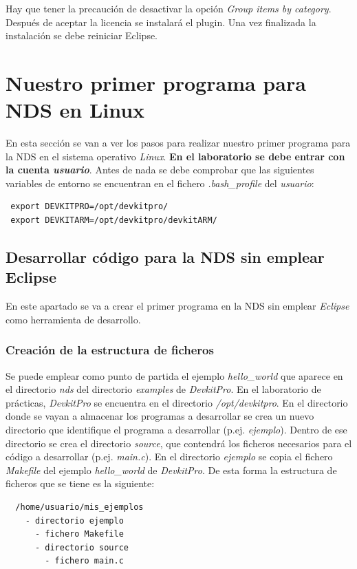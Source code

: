 Hay que tener la precaución de desactivar la opción \textit{Group items by category}. Después de aceptar la licencia se instalará el plugin. Una vez finalizada la instalación se debe reiniciar Eclipse.

\section{Nuestro primer programa para NDS en Linux}
En esta sección se van a ver los pasos para realizar nuestro primer programa para la NDS en el sistema operativo \textit{Linux}. \textbf{En el laboratorio se debe entrar con la cuenta \textit{usuario}}. Antes de nada se debe comprobar que las siguientes variables de entorno se encuentran en el fichero \textit{.bash\_profile} del \textit{usuario}:
\begin{verbatim}
 export DEVKITPRO=/opt/devkitpro/
 export DEVKITARM=/opt/devkitpro/devkitARM/
\end{verbatim}

\subsection{Desarrollar código para la NDS sin emplear Eclipse}
En este apartado se va a crear el primer programa en la NDS sin emplear \textit{Eclipse} como herramienta de desarrollo.

\subsubsection{Creación de la estructura de ficheros}
Se puede emplear como punto de partida el ejemplo  \textit{hello\_world} que aparece en el directorio \textit{nds} del directorio \textit{examples} de  \textit{DevkitPro}. En  el laboratorio de prácticas, \textit{DevkitPro} se encuentra en el directorio \textit{/opt/devkitpro}. En el directorio donde se vayan a almacenar los programas a desarro\-llar se crea un nuevo directorio que identifique el programa a desarrollar (p.ej. \textit{ejemplo}). Dentro de ese directorio se crea el directorio \textit{source}, que contendrá los ficheros necesarios para el código a desarrollar (p.ej. \textit{main.c}). En el directorio \textit{ejemplo} se copia el fichero \textit{Makefile} del  ejemplo  \textit{hello\_world} de \textit{DevkitPro}. De esta forma la estructura de ficheros que se tiene es la siguiente:
\begin{verbatim}
  /home/usuario/mis_ejemplos
    - directorio ejemplo
      - fichero Makefile
      - directorio source
        - fichero main.c
\end{verbatim}



